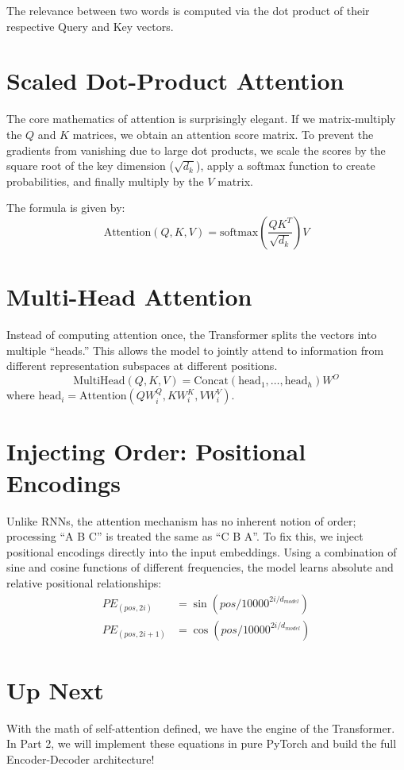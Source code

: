 \documentclass[12pt]{article}
\begin{document}
The relevance between two words is computed via the dot product of their respective Query and Key vectors. 

\section{Scaled Dot-Product Attention}
The core mathematics of attention is surprisingly elegant. If we matrix-multiply the $Q$ and $K$ matrices, we obtain an attention score matrix. To prevent the gradients from vanishing due to large dot products, we scale the scores by the square root of the key dimension ($\sqrt{d_k}$), apply a softmax function to create probabilities, and finally multiply by the $V$ matrix.

The formula is given by:
\begin{equation}
    \text{Attention}(Q, K, V) = \text{softmax}\left(\frac{QK^T}{\sqrt{d_k}}\right)V
\end{equation}

\section{Multi-Head Attention}
Instead of computing attention once, the Transformer splits the vectors into multiple ``heads.'' This allows the model to jointly attend to information from different representation subspaces at different positions. 
\begin{equation}
    \text{MultiHead}(Q, K, V) = \text{Concat}(\text{head}_1, \dots, \text{head}_h)W^O
\end{equation}
where $\text{head}_i = \text{Attention}(QW_i^Q, KW_i^K, VW_i^V)$.

\section{Injecting Order: Positional Encodings}
Unlike RNNs, the attention mechanism has no inherent notion of order; processing ``A B C'' is treated the same as ``C B A''. To fix this, we inject positional encodings directly into the input embeddings. Using a combination of sine and cosine functions of different frequencies, the model learns absolute and relative positional relationships:
\begin{align}
    PE_{(pos, 2i)} &= \sin(pos / 10000^{2i/d_{model}}) \\
    PE_{(pos, 2i+1)} &= \cos(pos / 10000^{2i/d_{model}})
\end{align}

\section{Up Next}
With the math of self-attention defined, we have the engine of the Transformer. In Part 2, we will implement these equations in pure PyTorch and build the full Encoder-Decoder architecture!
\end{document}
